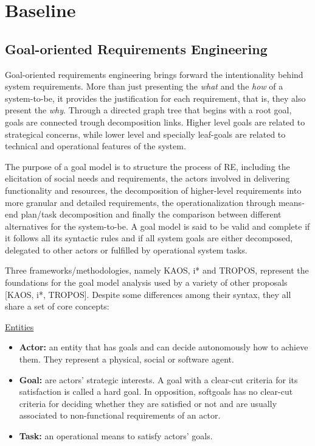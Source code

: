 \chapter{Baseline}\label{ch_baseline}%

\section{Goal-oriented Requirements Engineering}

Goal-oriented requirements engineering brings forward the intentionality behind system requirements. More than just presenting the \textit{what} and the \textit{how} of a system-to-be, it provides the justification for each requirement, that is, they also present the \textit{why}. Through a directed graph tree that begins with a root goal, goals are connected trough decomposition links. Higher level goals are related to strategical concerns, while lower level and specially leaf-goals are related to technical and operational features of the system. 

The purpose of a goal model is to structure the process of RE, including the elicitation of social needs and requirements, the actors involved in delivering functionality and resources, the decomposition of higher-level requirements into more granular and detailed requirements, the operationalization through means-end plan/task decomposition and finally the comparison between different alternatives for the system-to-be. A goal model is said to be valid and complete if it follows all its syntactic rules and if all system goals are either decomposed, delegated to other actors or fulfilled by operational system tasks. 

Three frameworks/methodologies, namely KAOS, i* and TROPOS, represent the foundations for the goal model analysis used by a variety of other proposals [KAOS, i*, TROPOS]. Despite some differences among their syntax, they all share a set of core concepts:
\medskip

\large{\underline{Entities}}

\begin{itemize}

\item \textbf{Actor:} an entity that has goals and can decide autonomously how to achieve them. They represent a physical, social or software agent.
\medskip

\item \textbf{Goal:} are actors' strategic interests. A goal with a clear-cut criteria for its satisfaction is called a hard goal. In opposition, softgoals has no clear-cut criteria for deciding whether they are satisfied or not and are usually associated to non-functional requirements of an actor.
\medskip

\item \textbf{Task:} an operational means to satisfy actors' goals.

\end{itemize}
\medskip

